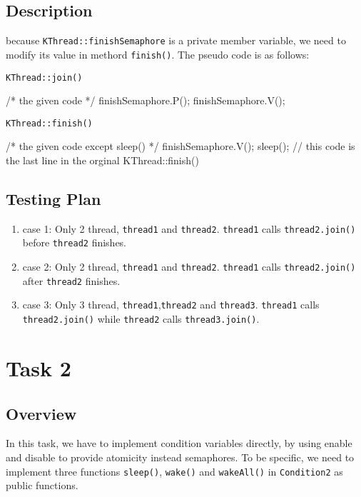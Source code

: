 \documentclass{article}
\begin{document}
\begin{spacing}{1.1}
    \subsection{Description}
    because \texttt{KThread::finishSemaphore} is a private
    member variable, we need to modify its value in methord \texttt{finish()}.  
    The pseudo code is as follows:
    \begin{algorithm}
      \caption{\texttt{KThread::join()}}
      \begin{algorithmic}[1]
	\STATE /* the given code */
	\STATE finishSemaphore.P();
	\STATE finishSemaphore.V();
      \end{algorithmic}
    \end{algorithm}

    \begin{algorithm}
      \caption{\texttt{KThread::finish()}}
      \begin{algorithmic}[1]
	\STATE /* the given code except sleep() */
	\STATE finishSemaphore.V();
	\STATE sleep(); // this code is the last line in the orginal KThread::finish()
      \end{algorithmic}
    \end{algorithm}

    \subsection{Testing Plan}
    \begin{enumerate}
      \item[] case 1: Only 2 thread, \texttt{thread1} and \texttt{thread2}. 
	\texttt{thread1} calls \texttt{thread2.join()} before \texttt{thread2} finishes.
      \item[] case 2: Only 2 thread, \texttt{thread1} and \texttt{thread2}.
	\texttt{thread1} calls \texttt{thread2.join()} after \texttt{thread2} finishes.
      \item[] case 3: Only 3 thread, \texttt{thread1},\texttt{thread2} and
	\texttt{thread3}. \texttt{thread1} calls \texttt{thread2.join()} while
	\texttt{thread2} calls \texttt{thread3.join()}.
    \end{enumerate}

    \section{Task 2}
    \subsection{Overview}
    In this task, we have to implement condition variables directly, by using enable and disable to provide atomicity instead semaphores. To be specific, we need to implement three functions \texttt{sleep()}, \texttt{wake()} and \texttt{wakeAll()} in \texttt{Condition2} as public functions.


\end{spacing}
\end{document}

